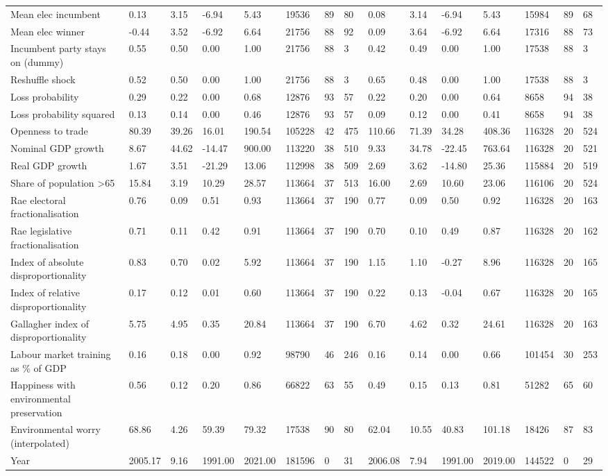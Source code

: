 \begin{longtable}{lllllllllllllll}
Mean elec incumbent & 0.13 & 3.15 & -6.94 & 5.43 & 19536 & 89 & 80 & 0.08 & 3.14 & -6.94 & 5.43 & 15984 & 89 & 68\\
Mean elec winner & -0.44 & 3.52 & -6.92 & 6.64 & 21756 & 88 & 92 & 0.09 & 3.64 & -6.92 & 6.64 & 17316 & 88 & 73\\
Incumbent party stays on (dummy) & 0.55 & 0.50 & 0.00 & 1.00 & 21756 & 88 & 3 & 0.42 & 0.49 & 0.00 & 1.00 & 17538 & 88 & 3\\
Reshuffle shock & 0.52 & 0.50 & 0.00 & 1.00 & 21756 & 88 & 3 & 0.65 & 0.48 & 0.00 & 1.00 & 17538 & 88 & 3\\
\addlinespace
Loss probability & 0.29 & 0.22 & 0.00 & 0.68 & 12876 & 93 & 57 & 0.22 & 0.20 & 0.00 & 0.64 & 8658 & 94 & 38\\
Loss probability squared & 0.13 & 0.14 & 0.00 & 0.46 & 12876 & 93 & 57 & 0.09 & 0.12 & 0.00 & 0.41 & 8658 & 94 & 38\\
Openness to trade & 80.39 & 39.26 & 16.01 & 190.54 & 105228 & 42 & 475 & 110.66 & 71.39 & 34.28 & 408.36 & 116328 & 20 & 524\\
Nominal GDP growth & 8.67 & 44.62 & -14.47 & 900.00 & 113220 & 38 & 510 & 9.33 & 34.78 & -22.45 & 763.64 & 116328 & 20 & 521\\
Real GDP growth & 1.67 & 3.51 & -21.29 & 13.06 & 112998 & 38 & 509 & 2.69 & 3.62 & -14.80 & 25.36 & 115884 & 20 & 519\\
\addlinespace
Share of population >65 & 15.84 & 3.19 & 10.29 & 28.57 & 113664 & 37 & 513 & 16.00 & 2.69 & 10.60 & 23.06 & 116106 & 20 & 524\\
Rae electoral fractionalisation & 0.76 & 0.09 & 0.51 & 0.93 & 113664 & 37 & 190 & 0.77 & 0.09 & 0.50 & 0.92 & 116328 & 20 & 163\\
Rae legislative fractionalisation & 0.71 & 0.11 & 0.42 & 0.91 & 113664 & 37 & 190 & 0.70 & 0.10 & 0.49 & 0.87 & 116328 & 20 & 162\\
Index of absolute disproportionality & 0.83 & 0.70 & 0.02 & 5.92 & 113664 & 37 & 190 & 1.15 & 1.10 & -0.27 & 8.96 & 116328 & 20 & 165\\
Index of relative disproportionality & 0.17 & 0.12 & 0.01 & 0.60 & 113664 & 37 & 190 & 0.22 & 0.13 & -0.04 & 0.67 & 116328 & 20 & 165\\
\addlinespace
Gallagher index of disproportionality & 5.75 & 4.95 & 0.35 & 20.84 & 113664 & 37 & 190 & 6.70 & 4.62 & 0.32 & 24.61 & 116328 & 20 & 163\\
Labour market training as \% of GDP & 0.16 & 0.18 & 0.00 & 0.92 & 98790 & 46 & 246 & 0.16 & 0.14 & 0.00 & 0.66 & 101454 & 30 & 253\\
Happiness with environmental preservation & 0.56 & 0.12 & 0.20 & 0.86 & 66822 & 63 & 55 & 0.49 & 0.15 & 0.13 & 0.81 & 51282 & 65 & 60\\
Environmental worry (interpolated) & 68.86 & 4.26 & 59.39 & 79.32 & 17538 & 90 & 80 & 62.04 & 10.55 & 40.83 & 101.18 & 18426 & 87 & 83\\
Year & 2005.17 & 9.16 & 1991.00 & 2021.00 & 181596 & 0 & 31 & 2006.08 & 7.94 & 1991.00 & 2019.00 & 144522 & 0 & 29\\
\bottomrule
\end{longtable}
